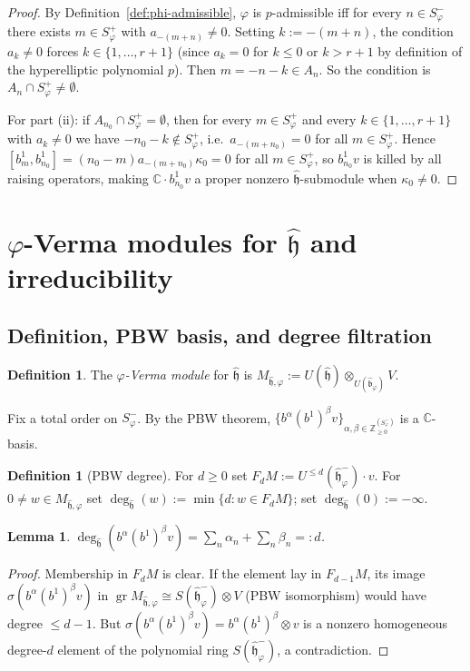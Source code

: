 \documentclass{amsart}
\DeclareMathOperator{\gr}{gr}
\newcommand{\Cx}{\mathbb{C}}
\newcommand{\Z}{\mathbb{Z}}
\newcommand{\h}{\mathfrak{h}}
\newcommand{\wh}[1]{\widehat{#1}}
\newcommand{\whh}{\wh{\h}}
\newtheorem{lemma}[theorem]{Lemma}
\theoremstyle{definition}
\newtheorem{definition}[theorem]{Definition}
\theoremstyle{remark}
\numberwithin{equation}{section}
\begin{document}
\begin{proof}
By Definition~\ref{def:phi-admissible}, $\varphi$ is $p$-admissible iff
for every $n\in S_\varphi^-$ there exists $m\in S_\varphi^+$ with
$a_{-(m+n)}\neq0$.  Setting $k:=-(m+n)$, the condition $a_k\neq0$ forces
$k\in\{1,\ldots,r+1\}$ (since $a_k=0$ for $k\le0$ or $k>r+1$ by
definition of the hyperelliptic polynomial $p$).  Then
$m=-n-k\in A_n$.  So the condition is $A_n\cap S_\varphi^+\neq\emptyset$.

For part (ii): if $A_{n_0}\cap S_\varphi^+=\emptyset$, then for every
$m\in S_\varphi^+$ and every $k\in\{1,\ldots,r+1\}$ with $a_k\neq0$ we
have $-n_0-k\notin S_\varphi^+$, i.e.\ $a_{-(m+n_0)}=0$ for all
$m\in S_\varphi^+$.  Hence $[b_m^1,b_{n_0}^1]=(n_0-m)a_{-(m+n_0)}\kappa_0=0$
for all $m\in S_\varphi^+$, so $b_{n_0}^1v$ is killed by all raising
operators, making $\Cx\cdot b_{n_0}^1v$ a proper nonzero $\whh$-submodule
when $\kappa_0\neq0$.
\end{proof}
\section{$\varphi$-Verma modules for $\whh$ and irreducibility}
\label{sec:verma-heis}
\subsection{Definition, PBW basis, and degree filtration}
\begin{definition}\label{def:phi-verma-heis}
The \emph{$\varphi$-Verma module} for $\whh$ is
$M_{\whh,\varphi}:=U(\whh)\otimes_{U(\wh{\mathfrak b}_\varphi)}V$.
\end{definition}
Fix a total order on $S_\varphi^-$.  By the PBW theorem,
$\{b^\alpha(b^1)^\beta v\}_{\alpha,\beta\in\Z_{\ge0}^{(S_\varphi^-)}}$
is a $\Cx$-basis.
\begin{definition}[PBW degree]\label{def:heis-degree}
For $d\ge0$ set $F_dM:=U^{\le d}(\whh_\varphi^-)\cdot v$.
For $0\neq w\in M_{\whh,\varphi}$ set
$\deg_{\whh}(w):=\min\{d:w\in F_dM\}$; set $\deg_{\whh}(0):=-\infty$.
\end{definition}
\begin{lemma}\label{lem:heis-degree-monomial}
$\deg_{\whh}(b^\alpha(b^1)^\beta v)=\sum_n\alpha_n+\sum_n\beta_n=:d$.
\end{lemma}
\begin{proof}
Membership in $F_dM$ is clear.  If the element lay in $F_{d-1}M$,
its image $\sigma(b^\alpha(b^1)^\beta v)$ in
$\gr M_{\whh,\varphi}\cong S(\whh_\varphi^-)\otimes V$ (PBW isomorphism)
would have degree $\le d-1$.  But $\sigma(b^\alpha(b^1)^\beta v)=
b^\alpha(b^1)^\beta\otimes v$ is a nonzero homogeneous degree-$d$ element
of the polynomial ring $S(\whh_\varphi^-)$, a contradiction.
\end{proof}
\end{document}
